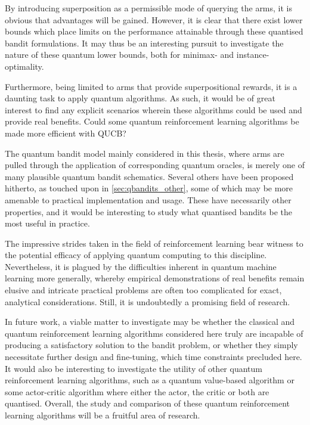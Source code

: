 By introducing superposition as a permissible mode of querying the arms, it is obvious that advantages will be gained.
However, it is clear that there exist lower bounds which place limits on the performance attainable through these quantised bandit formulations.
It may thus be an interesting pursuit to investigate the nature of these quantum lower bounds, both for minimax- and instance-optimality.

Furthermore, being limited to arms that provide superpositional rewards, it is a daunting task to apply quantum algorithms.
As such, it would be of great interest to find any explicit scenarios wherein these algorithms could be used and provide real benefits.
Could some quantum reinforcement learning algorithms be made more efficient with QUCB?

The quantum bandit model mainly considered in this thesis, where arms are pulled through the application of corresponding quantum oracles, is merely one of many plausible quantum bandit schematics.
Several others have been proposed hitherto, as touched upon in \cref{sec:qbandits_other}, some of which may be more amenable to practical implementation and usage.
These have necessarily other properties, and it would be interesting to study what quantised bandits be the most useful in practice.

The impressive strides taken in the field of reinforcement learning bear witness to the potential efficacy of applying quantum computing to this discipline.
Nevertheless, it is plagued by the difficulties inherent in quantum machine learning more generally, whereby empirical demonstrations of real benefits remain elusive and intricate practical problems are often too complicated for exact, analytical considerations.
Still, it is undoubtedly a promising field of research.

In future work, a viable matter to investigate may be whether the classical and quantum reinforcement learning algorithms considered here truly are incapable of producing a satisfactory solution to the bandit problem, or whether they simply necessitate further design and fine-tuning, which time constraints precluded here.
It would also be interesting to investigate the utility of other quantum reinforcement learning algorithms, such as a quantum value-based algorithm or some actor-critic algorithm where either the actor, the critic or both are quantised.
Overall, the study and comparison of these quantum reinforcement learning algorithms will be a fruitful area of research.
